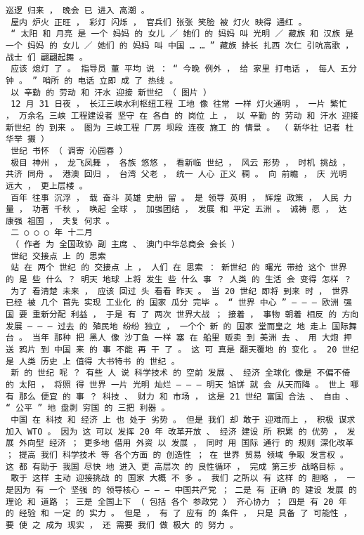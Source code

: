 \documentclass{article}
\begin{document}
\begin{Verbatim}[commandchars=\\\{\}]
 巡逻 归来 ， 晚会 已 进入 高潮 。 
 屋内 炉火 正旺 ， 彩灯 闪烁 ， 官兵们 张张 笑脸 被 灯火 映得 通红 。 
 “ 太阳 和 月亮 是 一个 妈妈 的 女儿 ／ 她们 的 妈妈 叫 光明 ／ 藏族 和 汉族 是 一个 妈妈 的 女儿 ／ 她们 的 妈妈 叫 中国 … … ” 藏族 排长 扎西 次仁 引吭高歌 ， 战士 们 翩翩起舞 。 
 应该 熄灯 了 。 指导员 董 平均 说 ： “ 今晚 例外 ， 给 家里 打电话 ， 每人 五分钟 。 ” 哨所 的 电话 立即 成 了 热线 。 
 以 辛勤 的 劳动 和 汗水 迎接 新世纪 （ 图片 ） 
 12 月 31 日夜 ， 长江三峡水利枢纽工程 工地 像 往常 一样 灯火通明 ， 一片 繁忙 ， 万余名 三峡 工程建设者 坚守 在 各自 的 岗位 上 ， 以 辛勤 的 劳动 和 汗水 迎接 新世纪 的 到来 。 图为 三峡工程 厂房 坝段 连夜 施工 的 情景 。 （ 新华社 记者 杜华举 摄 ） 
 世纪 书怀 （ 调寄 沁园春 ） 
 极目 神州 ， 龙飞凤舞 ， 各族 悠悠 ， 看新临 世纪 ， 风云 形势 ， 时机 挑战 ， 共济 同舟 。 港澳 回归 ， 台湾 父老 ， 统一 人心 正义 稠 。 向 前瞻 ， 庆 光明 远大 ， 更上层楼 。 
 百年 往事 沉浮 ， 载 奋斗 英雄 史册 留 。 是 领导 英明 ， 辉煌 政策 ， 人民 力量 ， 功著 千秋 ， 唤起 全球 ， 加强团结 ， 发展 和 平定 五洲 。 诚祷 愿 ， 达 康强 祖国 ， 夫复 何求 。 
 二 ○ ○ ○ 年 十二月 
 （ 作者 为 全国政协 副 主席 、 澳门中华总商会 会长 ） 
 世纪 交接点 上 的 思索 
 站 在 两个 世纪 的 交接点 上 ， 人们 在 思索 ： 新世纪 的 曙光 带给 这个 世界 的 是 些 什么 ？ 明天 地球 上将 发生 些 什么 事 ？ 人类 的 生活 会 变得 怎样 ？ 
 为了 看清楚 未来 ， 应该 回过 头 看看 昨天 。 当 20 世纪 即将 到来 时 ， 世界 已经 被 几个 首先 实现 工业化 的 国家 瓜分 完毕 。 “ 世界 中心 ” — — — 欧洲 强国 要 重新分配 利益 ， 于是 有 了 两次 世界大战 ； 接着 ， 事物 朝着 相反 的 方向 发展 — — — 过去 的 殖民地 纷纷 独立 ， 一个个 新 的 国家 堂而皇之 地 走上 国际舞台 。 当年 那种 把 黑人 像 沙丁鱼 一样 塞 在 船里 贩卖 到 美洲 去 、 用 大炮 押送 鸦片 到 中国 来 的 事 不能 再 干 了 。 这 可 真是 翻天覆地 的 变化 。 20 世纪 是 人类 历史 上 值得 大书特书 的 世纪 。 
 新 的 世纪 呢 ？ 有些 人 说 科学技术 的 空前 发展 、 经济 全球化 像是 不偏不倚 的 太阳 ， 将照 得 世界 一片 光明 灿烂 — — — 明天 馅饼 就 会 从天而降 。 世上 哪有 那么 便宜 的 事 ？ 科技 、 财力 和 市场 ， 这是 21 世纪 富国 合法 、 自由 、 “ 公平 ” 地 盘剥 穷国 的 三把 利器 。 
 中国 在 科技 和 经济 上 也 处于 劣势 。 但是 我们 却 敢于 迎难而上 ， 积极 谋求 加入 WTO 。 因为 这 可以 发挥 20 年 改革开放 、 经济 建设 所 积累 的 优势 ， 发展 外向型 经济 ； 更多地 借用 外资 以 发展 ， 同时 用 国际 通行 的 规则 深化改革 ； 提高 我们 科学技术 等 各个方面 的 创造性 ； 在 世界 贸易 领域 争取 发言权 。 这 都 有助于 我国 尽快 地 进入 更 高层次 的 良性循环 ， 完成 第三步 战略目标 。 
 敢于 这样 主动 迎接挑战 的 国家 大概 不 多 。 我们 之所以 有 这样 的 胆略 ， 一 是因为 有 一个 坚强 的 领导核心 — — — 中国共产党 ； 二是 有 正确 的 建设 发展 的 理论 和 道路 ； 三是 全国上下 （ 包括 各个 参政党 ） 齐心协力 ； 四是 有 20 年 的 经验 和 一定 的 实力 。 但是 ， 有 了 应有 的 条件 ， 只是 具备 了 可能性 ， 要 使 之 成为 现实 ， 还 需要 我们 做 极大 的 努力 。 

\end{Verbatim}
\end{document}

